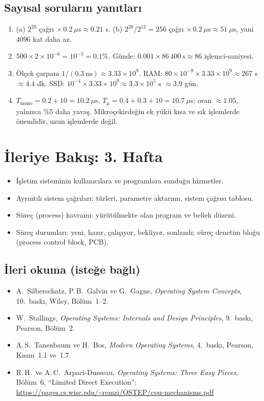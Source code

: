 \subsection*{Sayısal soruların yanıtları}
\begin{enumerate}[leftmargin=1.6em,start=11]
  \item (a) $2^{20}$ çağrı $\times\, 0.2\ \mu\text{s} \approx 0.21$ s. (b) $2^{20}/2^{12} = 256$ çağrı $\times\, 0.2\ \mu\text{s} \approx 51\ \mu\text{s}$, yani $4096$ kat daha az.
  \item $500 \times 2\times10^{-6} = 10^{-3} = 0.1\%$. Günde: $0.001 \times 86\,400\ \text{s} \approx 86$ işlemci-saniyesi.
  \item Ölçek çarpanı $1/(0.3\ \text{ns}) \approx 3.33\times10^{9}$. RAM: $80\times10^{-9} \times 3.33\times10^{9} \approx 267$ s $\approx 4.4$ dk. SSD: $10^{-4} \times 3.33\times10^{9} \approx 3.3\times10^{5}$ s $\approx 3.9$ gün.
  \item $T_{\text{mono}} = 0.2 + 10 = 10.2\ \mu$s, $T_{\mu} = 0.4 + 0.3 + 10 = 10.7\ \mu$s; oran $\approx 1.05$, yalnızca \%5 daha yavaş. Mikroçekirdeğin ek yükü kısa ve sık işlemlerde önemlidir, uzun işlemlerde değil.
\end{enumerate}

\section{İleriye Bakış: 3. Hafta}

\begin{itemize}
  \item İşletim sisteminin kullanıcılara ve programlara sunduğu hizmetler.
  \item Ayrıntılı sistem çağrıları: türleri, parametre aktarımı, sistem çağrısı tablosu.
  \item Süreç (process) kavramı: yürütülmekte olan program ve bellek düzeni.
  \item Süreç durumları: yeni, hazır, çalışıyor, bekliyor, sonlandı; süreç denetim bloğu (process control block, PCB).
\end{itemize}

\subsection*{İleri okuma (isteğe bağlı)}
\begin{itemize}
  \item A.\ Silberschatz, P.\,B.\ Galvin ve G.\ Gagne, \emph{Operating System Concepts}, 10.\ baskı, Wiley, Bölüm~1--2.
  \item W.\ Stallings, \emph{Operating Systems: Internals and Design Principles}, 9.\ baskı, Pearson, Bölüm~2.
  \item A.\,S.\ Tanenbaum ve H.\ Bos, \emph{Modern Operating Systems}, 4.\ baskı, Pearson, Kısım~1.1 ve~1.7.
  \item R.\,H.\ ve A.\,C.\ Arpaci-Dusseau, \emph{Operating Systems: Three Easy Pieces}, Bölüm~6, ``Limited Direct Execution'': \url{https://pages.cs.wisc.edu/~remzi/OSTEP/cpu-mechanisms.pdf}
\end{itemize}
